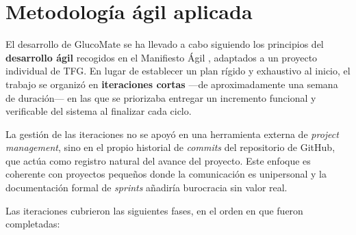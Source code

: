 \section{Metodología ágil aplicada}
\label{sec:metodologia-agil}

El desarrollo de GlucoMate se ha llevado a cabo siguiendo los principios del
\textbf{desarrollo ágil} recogidos en el Manifiesto Ágil \cite{agilemanifesto2001},
adaptados a un proyecto individual de TFG. En lugar de establecer un plan rígido y
exhaustivo al inicio, el trabajo se organizó en \textbf{iteraciones cortas} —de
aproximadamente una semana de duración— en las que se priorizaba entregar un incremento
funcional y verificable del sistema al finalizar cada ciclo.

La gestión de las iteraciones no se apoyó en una herramienta externa de \textit{project
management}, sino en el propio historial de \textit{commits} del repositorio de GitHub,
que actúa como registro natural del avance del proyecto. Este enfoque es coherente con
proyectos pequeños donde la comunicación es unipersonal y la documentación formal de
\textit{sprints} añadiría burocracia sin valor real.

Las iteraciones cubrieron las siguientes fases, en el orden en que fueron completadas:


